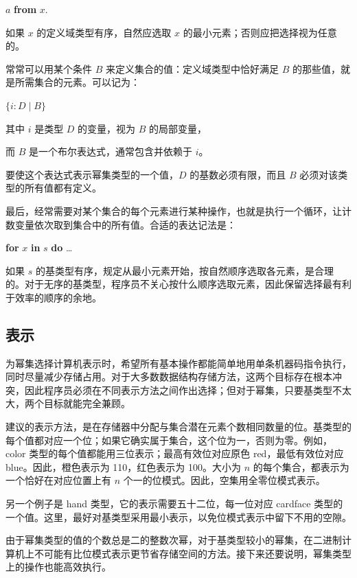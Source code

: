 \documentclass[twoside,11pt,fontset=none]{ctexbook}
\begin{document}
\quad $a$ \textbf{from} $x$.

\noindent
如果 $x$ 的定义域类型有序，自然应选取 $x$ 的最小元素；否则应把选择视为任意的。

常常可以用某个条件 $B$ 来定义集合的值：定义域类型中恰好满足 $B$ 的那些值，就是所需集合的元素。可以记为：

\quad $\{i:D \mid B\}$

\noindent
其中 \tabto*{4em} $i$ 是类型 $D$ 的变量，视为 $B$ 的局部变量，

\noindent
而 \tabto*{4em} $B$ 是一个布尔表达式，通常包含并依赖于 $i$。

\noindent
要使这个表达式表示幂集类型的一个值，$D$ 的基数必须有限，而且 $B$ 必须对该类型的所有值都有定义。

最后，经常需要对某个集合的每个元素进行某种操作，也就是执行一个循环，让计数变量依次取到集合中的所有值。合适的表达记法是：

\quad \textbf{for} $x$ \textbf{in} $s$ \textbf{do} \dots

\noindent
如果 $s$ 的基类型有序，规定从最小元素开始，按自然顺序选取各元素，是合理的。对于无序的基类型，程序员不关心按什么顺序选取元素，因此保留选择最有利于效率的顺序的余地。

\subsection{表示}

为幂集选择计算机表示时，希望所有基本操作都能简单地用单条机器码指令执行，同时尽量减少存储占用。对于大多数数据结构存储方法，这两个目标存在根本冲突，因此程序员必须在不同表示方法之间作出选择；但对于幂集，只要基类型不太大，两个目标就能完全兼顾。

建议的表示方法，是在存储器中分配与集合潜在元素个数相同数量的位。基类型的每个值都对应一个位；如果它确实属于集合，这个位为一，否则为零。例如，color 类型的每个值都能用三位表示；最高有效位对应原色 red，最低有效位对应 blue。因此，橙色表示为 110，红色表示为 100。大小为 $n$ 的每个集合，都表示为一个恰好在对应位置上有 $n$ 个一的位模式。因此，空集用全零位模式表示。

另一个例子是 hand 类型，它的表示需要五十二位，每一位对应 cardface 类型的一个值。这里，最好对基类型采用最小表示，以免位模式表示中留下不用的空隙。

由于幂集类型的值的个数总是二的整数次幂，对于基类型较小的幂集，在二进制计算机上不可能有比位模式表示更节省存储空间的方法。接下来还要说明，幂集类型上的操作也能高效执行。
\end{document}
